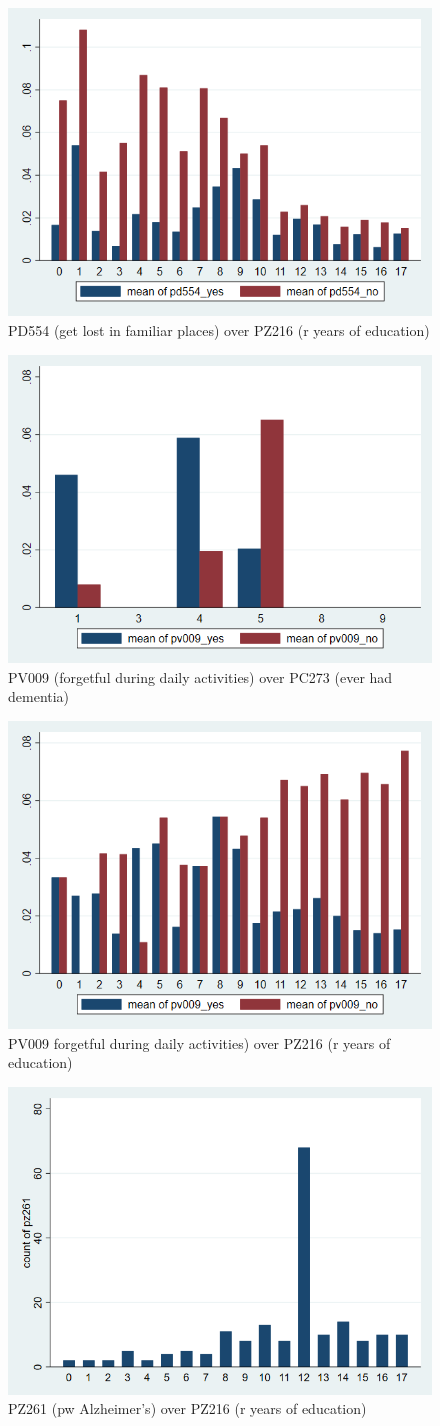 \documentclass{article}
\begin{document}
\begin{figure}
    \centering
    \includegraphics[width=0.5\linewidth]{pd554_over_pz216.png}
    \caption{PD554 (get lost in familiar places) over PZ216 (r years of education)
}
    \label{fig:enter-label}
\end{figure}

\begin{figure}
    \centering
    \includegraphics[width=0.5\linewidth]{pv009_over_pc273.png}
    \caption{PV009 (forgetful during daily activities) over PC273 (ever had dementia)}
    \label{fig:enter-label}
\end{figure}

\begin{figure}
    \centering
    \includegraphics[width=0.5\linewidth]{pv009_over_pz216.png}
    \caption{PV009 forgetful during daily activities) over PZ216 (r years of education)}
    \label{fig:enter-label}
\end{figure}

\begin{figure}
    \centering
    \includegraphics[width=0.5\linewidth]{pz261_over_pz216.png}
    \caption{PZ261 (pw Alzheimer's) over PZ216 (r years of education)
}
    \label{fig:enter-label}
\end{figure}
\end{document}
